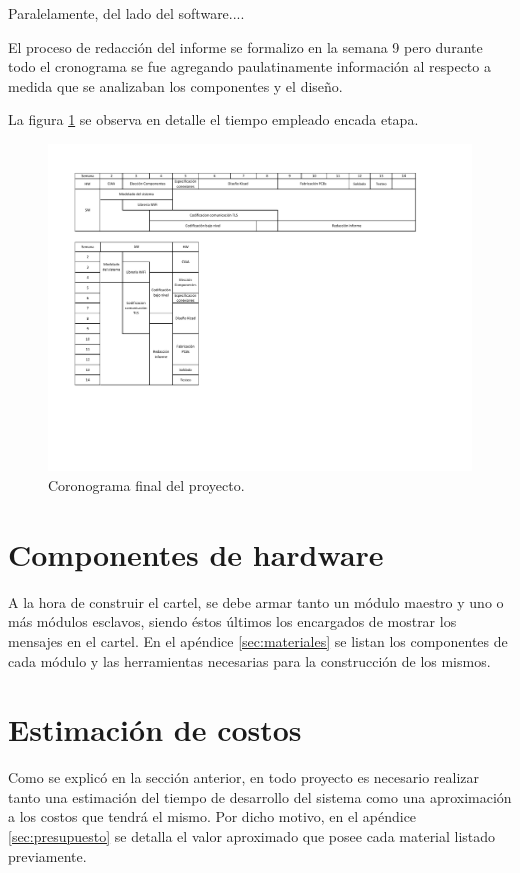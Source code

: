 Paralelamente, del lado del software....


El proceso de redacción del informe se formalizo en la semana 9 pero durante todo el cronograma se fue agregando paulatinamente información al respecto a medida que se analizaban los componentes y el diseño.

La figura \ref{fig:cronograma} se observa en detalle el tiempo empleado encada etapa.

\begin{figure}[ht!]
	\begin{center}
		\centering
		\includegraphics[scale=1.4]{tablas/cronograma.pdf}
		\caption{Coronograma final del proyecto.}
		\label{fig:cronograma}
	\end{center}
\end{figure}

\section{Componentes de hardware}
A la hora de construir el cartel, se debe armar tanto un módulo maestro y uno o más módulos esclavos, siendo éstos últimos los encargados de mostrar los mensajes en el cartel.
En el apéndice \ref{sec:materiales} se listan los componentes de cada módulo y las herramientas necesarias para la construcción de los mismos.


\section{Estimación de costos}
Como se explicó en la sección anterior, en todo proyecto es necesario realizar tanto una estimación del tiempo de desarrollo del sistema como una aproximación a los costos que tendrá el mismo.
Por dicho motivo, en el apéndice \ref{sec:presupuesto} se detalla el valor aproximado que posee cada material listado previamente.
